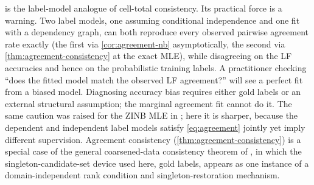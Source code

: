  is the label-model analogue of
cell-total consistency. Its practical force is a warning. Two label
models, one assuming conditional independence and one fit with a
dependency graph, can both reproduce every observed pairwise
agreement rate exactly (the first via \cref{cor:agreement-nb}
asymptotically, the second via \cref{thm:agreement-consistency} at
the exact MLE), while disagreeing on the LF accuracies and hence on
the probabilistic training labels. A practitioner checking ``does
the fitted model match the observed LF agreement?'' will see a
perfect fit from a biased model. Diagnosing accuracy bias requires
either gold labels or an external structural assumption; the marginal
agreement fit cannot do it. The same caution was raised for the ZINB
MLE in \citet{towell2026scrnacoarsening}; here it is sharper, because
the dependent and independent label models satisfy
\eqref{eq:agreement} jointly yet imply different supervision.
Agreement consistency (\cref{thm:agreement-consistency}) is a special
case of the general coarsened-data consistency theorem of
\citet{towell2026synthesis}, in which the singleton-candidate-set
device used here, gold labels, appears as one instance of a
domain-independent rank condition and singleton-restoration mechanism.
